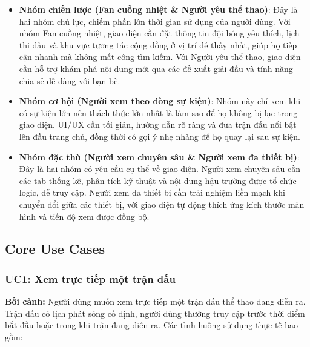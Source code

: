 \begin{itemize}
    \item \textbf{Nhóm chiến lược (Fan cuồng nhiệt \& Người yêu thể thao)}: Đây là hai nhóm chủ lực, chiếm phần lớn thời gian sử dụng của người dùng. Với nhóm Fan cuồng nhiệt, giao diện cần đặt thông tin đội bóng yêu thích, lịch thi đấu và khu vực tương tác cộng đồng ở vị trí dễ thấy nhất, giúp họ tiếp cận nhanh mà không mất công tìm kiếm. Với Người yêu thể thao, giao diện cần hỗ trợ khám phá nội dung mới qua các đề xuất giải đấu và tính năng chia sẻ dễ dàng với bạn bè.
    
    \item \textbf{Nhóm cơ hội (Người xem theo dòng sự kiện)}: Nhóm này chỉ xem khi có sự kiện lớn nên thách thức lớn nhất là làm sao để họ không bị lạc trong giao diện. UI/UX cần tối giản, hướng dẫn rõ ràng và đưa trận đấu nổi bật lên đầu trang chủ, đồng thời có gợi ý nhẹ nhàng để họ quay lại sau sự kiện.
    
    \item \textbf{Nhóm đặc thù (Người xem chuyên sâu \& Người xem đa thiết bị)}: Đây là hai nhóm có yêu cầu cụ thể về giao diện. Người xem chuyên sâu cần các tab thống kê, phân tích kỹ thuật và nội dung hậu trường được tổ chức logic, dễ truy cập. Người xem đa thiết bị cần trải nghiệm liền mạch khi chuyển đổi giữa các thiết bị, với giao diện tự động thích ứng kích thước màn hình và tiến độ xem được đồng bộ.
\end{itemize}


\subsection{Core Use Cases}

\subsubsection{UC1: Xem trực tiếp một trận đấu}

\textbf{Bối cảnh:} Người dùng muốn xem trực tiếp một trận đấu thể thao đang diễn ra. Trận đấu có lịch phát sóng cố định, người dùng thường truy cập trước thời điểm bắt đầu hoặc trong khi trận đang diễn ra. Các tình huống sử dụng thực tế bao gồm:

